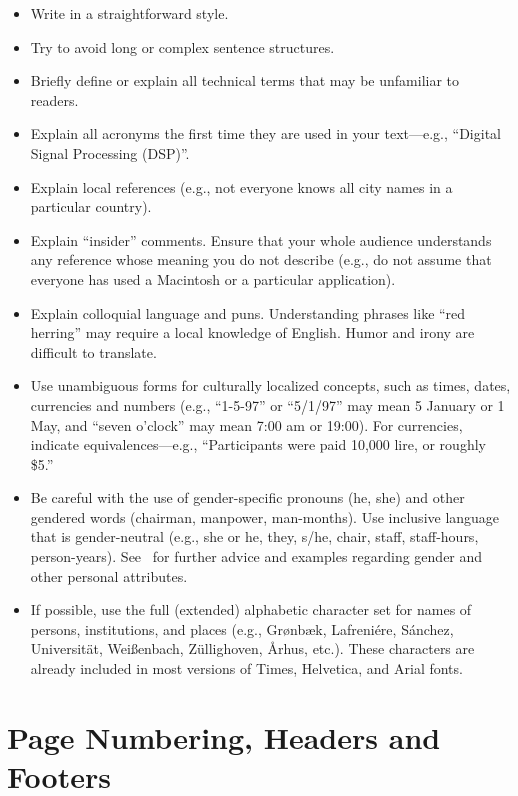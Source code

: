 \documentclass{sigchi}
\begin{document}
\begin{itemize}
\item Write in a straightforward style.
\item Try to avoid long or complex sentence structures.
\item Briefly define or explain all technical terms that may be
  unfamiliar to readers.
\item Explain all acronyms the first time they are used in your text---e.g.,
``Digital Signal Processing (DSP)''.
\item Explain local references (e.g., not everyone knows all city
  names in a particular country).
\item Explain ``insider'' comments. Ensure that your whole audience
  understands any reference whose meaning you do not describe (e.g.,
  do not assume that everyone has used a Macintosh or a particular
  application).
\item Explain colloquial language and puns. Understanding phrases like
  ``red herring'' may require a local knowledge of English.  Humor and
  irony are difficult to translate.
\item Use unambiguous forms for culturally localized concepts, such as
  times, dates, currencies and numbers (e.g., ``1-5-97'' or ``5/1/97''
  may mean 5 January or 1 May, and ``seven o'clock'' may mean 7:00 am or
  19:00).  For currencies, indicate equivalences---e.g., ``Participants
  were paid 10,000 lire, or roughly \$5.''
\item Be careful with the use of gender-specific pronouns (he, she)
  and other gendered words (chairman, manpower, man-months). Use
  inclusive language that is gender-neutral (e.g., she or he, they,
  s/he, chair, staff, staff-hours,
  person-years). See~\cite{Schwartz:1995:GBF} for further advice and
  examples regarding gender and other personal attributes.
\item If possible, use the full (extended) alphabetic character set
  for names of persons, institutions, and places (e.g.,
  Gr{\o}nb{\ae}k, Lafreni\'ere, S\'anchez, Universit{\"a}t,
  Wei{\ss}enbach, Z{\"u}llighoven, \r{A}rhus, etc.).  These characters
  are already included in most versions of Times, Helvetica, and Arial
  fonts.
\end{itemize}

\section{Page Numbering, Headers and Footers}
\end{document}
